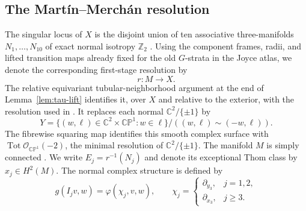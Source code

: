 \documentclass[11pt]{article}
\theoremstyle{remark}\newtheorem{remark}[theorem]{Remark}
\newcommand{\C}{\mathbb C}
\newcommand{\Z}{\mathbb Z}
\newcommand{\CP}{\mathbb {CP}}
\begin{document}
\subsection{The Mart\'in--Merch\'an resolution}
The singular locus of $X$ is the disjoint union of ten associative
three-manifolds $N_1,\ldots,N_{10}$ of exact normal isotropy $\Z_2$
\cite[Section 2]{MM}.  Using the component frames, radii, and lifted
transition maps already fixed for the old $G$-strata in the Joyce atlas,
we denote the corresponding first-stage resolution by
\begin{equation}\label{eq:M-resolution}r:M\longrightarrow X.\end{equation}
The relative equivariant
tubular-neighborhood argument at the end of Lemma~\ref{lem:tau-lift}
identifies it, over $X$ and relative to the exterior, with the resolution
used in \cite{MM}.  It replaces each normal
$\C^2/\{\pm1\}$ by
\begin{equation}\label{eq:Y-model}
Y=\{(w,\ell)\in\C^2\times\CP^1:w\in\ell\}/((w,\ell)\sim(-w,\ell)).
\end{equation}
The fibrewise squaring map identifies this smooth complex surface with
$\operatorname{Tot}\mathcal O_{\CP^1}(-2)$, the minimal resolution of
$\C^2/\{\pm1\}$.
The manifold $M$ is simply connected \cite[Section 2.2]{MM}.  We write
$E_j=r^{-1}(N_j)$ and denote its exceptional Thom class by
$x_j\in H^2(M)$.  The normal complex
structure is defined by
\begin{equation}\label{eq:normal-I}
g(I_jv,w)=\varphi(\chi_j,v,w),\qquad
\chi_j=\begin{cases}\partial_{y_3},&j=1,2,\\
\partial_{x_3},&j\ge3.\end{cases}
\end{equation}
\end{document}
